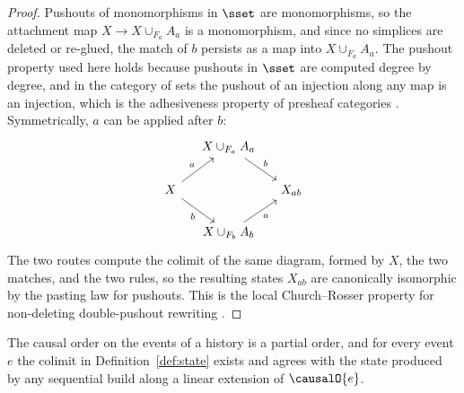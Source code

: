 \begin{proof}
Pushouts of monomorphisms in $\sset$ are monomorphisms, so the attachment map $X \to X \cup_{F_a} A_a$ is a monomorphism, and since no simplices are deleted or re-glued, the match of $b$ persists as a map into $X \cup_{F_a} A_a$.
The pushout property used here holds because pushouts in $\sset$ are computed degree by degree, and in the category of sets the pushout of an injection along any map is an injection, which is the adhesiveness property of presheaf categories \citep{ehrig2006dpo}.
Symmetrically, $a$ can be applied after $b$:
\[
\begin{tikzcd}[column sep=small]
  & X \cup_{F_a} A_a \arrow[dr, "b"] & \\
  X \arrow[ur, "a"] \arrow[dr, "b"'] & & X_{ab} \\
  & X \cup_{F_b} A_b \arrow[ur, "a"'] &
\end{tikzcd}
\]
The two routes compute the colimit of the same diagram, formed by $X$, the two matches, and the two rules, so the resulting states $X_{ab}$ are canonically isomorphic by the pasting law for pushouts.
This is the local Church--Rosser property for non-deleting double-pushout rewriting \citep{ehrig2006dpo}.
\end{proof}

\begin{proposition}
\label{prop:welldef}
The causal order on the events of a history is a partial order, and for every event $e$ the colimit in Definition~\ref{def:state} exists and agrees with the state produced by any sequential build along a linear extension of $\causalO{e}$.
\end{proposition}


